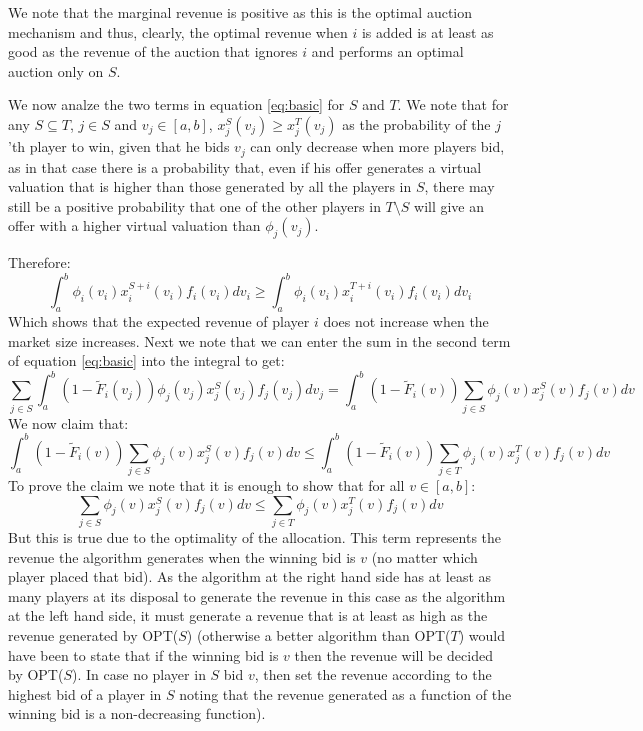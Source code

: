 \documentclass[a4page,notitlepage]{article}
\begin{document}
\begin{enumerate}
  We note that the marginal revenue is positive as this is the optimal auction mechanism and thus, clearly, the optimal revenue when $i$ is added is at least as good as the revenue of the auction that ignores $i$ and performs an optimal auction only on $S$.

  We now analze the two terms in equation \ref{eq:basic} for $S$ and $T$.
  We note that for any $S\subseteq T$, $j\in S$ and $v_j\in [a,b]$, $x_j^S(v_j)\geq x_j^T(v_j)$ as the probability of the $j$'th player to win, given that he bids $v_j$ can only decrease when more players bid, as in that case there is a probability that, even if his offer generates a virtual valuation that is higher than those generated by all the players in $S$, there may still be a positive probability that one of the other players in $T\setminus S$ will give an offer with a higher virtual valuation than $\phi_j(v_j)$.
  
Therefore:
\begin{equation*}
  \int_a^b\phi_i(v_i)x_i^{S+{i}}(v_i)f_i(v_i)dv_i \geq \int_a^b\phi_i(v_i)x_i^{T+{i}}(v_i)f_i(v_i)dv_i
\end{equation*}
Which shows that the expected revenue of player $i$ does not increase when the market size increases.
Next we note that we can enter the sum in the second term of equation \ref{eq:basic} into the integral to get:
\begin{equation}
  \label{eq:sumint}
  \sum_{j\in S}\int_a^b(1-\tilde{F}_i(v_j))\phi_j(v_j)x_j^S(v_j)f_j(v_j)dv_j = \int_a^b(1-\tilde{F}_i(v))\sum_{j\in S}\phi_j(v)x_j^S(v)f_j(v)dv
\end{equation}
We now claim that:
\begin{equation*}
  \int_a^b(1-\tilde{F}_i(v))\sum_{j\in S}\phi_j(v)x_j^S(v)f_j(v)dv \leq \int_a^b(1-\tilde{F}_i(v))\sum_{j\in T}\phi_j(v)x_j^T(v)f_j(v)dv
\end{equation*}
To prove the claim we note that it is enough to show that for all $v \in [a,b]$:
\begin{equation*}
  \sum_{j\in S}\phi_j(v)x_j^S(v)f_j(v)dv \leq \sum_{j\in T}\phi_j(v)x_j^T(v)f_j(v)dv
\end{equation*}
But this is true due to the optimality of the allocation.
This term represents the revenue the algorithm generates when the winning bid is $v$ (no matter which player placed that bid).
As the algorithm at the right hand side has at least as many players at its disposal to generate the revenue in this case as the algorithm at the left hand side, it must generate a revenue that is at least as high as the revenue generated by OPT($S$) (otherwise a better algorithm than OPT($T$) would have been to state that if the winning bid is $v$ then the revenue will be decided by OPT($S$). In case no player in $S$ bid $v$, then set the revenue according to the highest bid of a player in $S$ noting that the revenue generated as a function of the winning bid is a non-decreasing function).


\end{enumerate}
\end{document}
